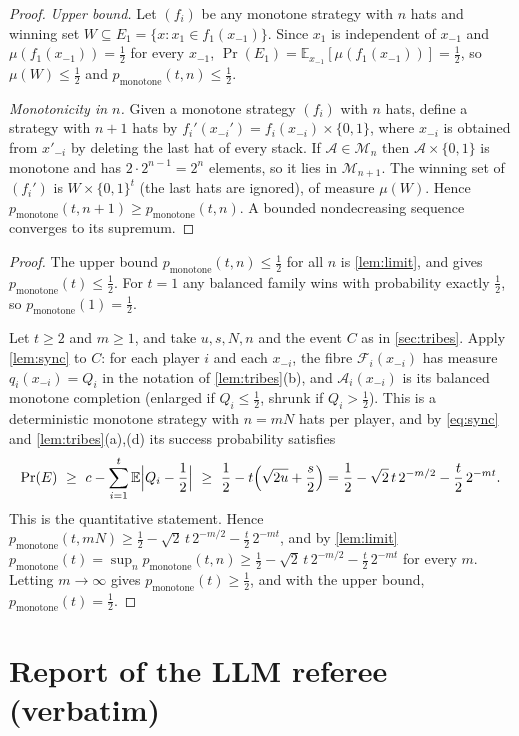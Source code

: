 \documentclass[11pt,a4paper]{article}
\theoremstyle{plain}
\theoremstyle{definition}
\theoremstyle{remark}
\newcommand{\E}{\mathbb E}
\newcommand{\Prob}{\Pr}
\newcommand{\cA}{\mathcal A}
\newcommand{\cF}{\mathcal F}
\newcommand{\cM}{\mathcal M}
\newcommand{\pmon}{p_{\mathrm{monotone}}}
\begin{document}
\label{pf:limit}
\lemlimit*
\begin{proof}
\emph{Upper bound.} Let $(f_i)$ be any monotone strategy with $n$ hats and winning set $W\subseteq E_1=\{x:x_1\in f_1(x_{-1})\}$. Since $x_1$ is independent of $x_{-1}$ and $\mu(f_1(x_{-1}))=\frac12$ for every $x_{-1}$, $\Prob(E_1)=\E_{x_{-1}}[\mu(f_1(x_{-1}))]=\frac12$, so $\mu(W)\le\frac12$ and $\pmon(t,n)\le\frac12$.

\emph{Monotonicity in $n$.} Given a monotone strategy $(f_i)$ with $n$ hats, define a strategy with $n+1$ hats by $f_i'(x_{-i}')=f_i(x_{-i})\times\{0,1\}$, where $x_{-i}$ is obtained from $x'_{-i}$ by deleting the last hat of every stack. If $\cA\in\cM_n$ then $\cA\times\{0,1\}$ is monotone and has $2\cdot2^{n-1}=2^n$ elements, so it lies in $\cM_{n+1}$. The winning set of $(f_i')$ is $W\times\{0,1\}^t$ (the last hats are ignored), of measure $\mu(W)$. Hence $\pmon(t,n+1)\ge\pmon(t,n)$. A bounded nondecreasing sequence converges to its supremum.
\end{proof}

\label{pf:main}
\thmmain*
\begin{proof}
The upper bound $\pmon(t,n)\le\frac12$ for all $n$ is \cref{lem:limit}, and gives $\pmon(t)\le\frac12$. For $t=1$ any balanced family wins with probability exactly $\frac12$, so $\pmon(1)=\frac12$.

Let $t\ge2$ and $m\ge1$, and take $u,s,N,n$ and the event $C$ as in \cref{sec:tribes}. Apply \cref{lem:sync} to $C$: for each player $i$ and each $x_{-i}$, the fibre $\cF_i(x_{-i})$ has measure $q_i(x_{-i})=Q_i$ in the notation of \cref{lem:tribes}(b), and $\cA_i(x_{-i})$ is its balanced monotone completion (enlarged if $Q_i\le\frac12$, shrunk if $Q_i>\frac12$). This is a deterministic monotone strategy with $n=mN$ hats per player, and by \eqref{eq:sync} and \cref{lem:tribes}(a),(d) its success probability satisfies
\[
 \Prob(E)\ \ge\ c-\sum_{i=1}^t\E\Bigl|Q_i-\frac12\Bigr|\ \ge\ \frac12-t\Bigl(\sqrt{2u}+\frac s2\Bigr)
 =\frac12-\sqrt2\,t\,2^{-m/2}-\frac t2\,2^{-mt}.
\]
This is the quantitative statement. Hence $\pmon(t,mN)\ge\frac12-\sqrt2\,t\,2^{-m/2}-\frac t2\,2^{-mt}$, and by \cref{lem:limit} $\pmon(t)=\sup_n\pmon(t,n)\ge\frac12-\sqrt2\,t\,2^{-m/2}-\frac t2\,2^{-mt}$ for every $m$. Letting $m\to\infty$ gives $\pmon(t)\ge\frac12$, and with the upper bound, $\pmon(t)=\frac12$.
\end{proof}

\section{Report of the LLM referee (verbatim)}\label{app:referee}
\end{document}
